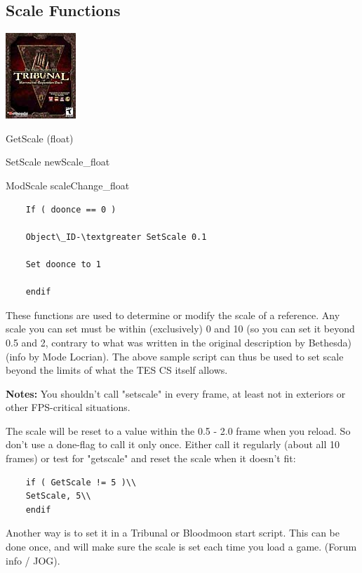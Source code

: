 \hypertarget{scale-functions}{%
\subsection{\texorpdfstring{\hfill\break
Scale Functions}{ Scale Functions}}\label{scale-functions}}

\includegraphics{media/image6.png}

	GetScale (float)
	
	SetScale newScale\_float
	
	ModScale scaleChange\_float

\begin{lstlisting}	
	If ( doonce == 0 )
	
	Object\_ID-\textgreater SetScale 0.1
	
	Set doonce to 1
	
	endif
\end{lstlisting}

These functions are used to determine or modify the scale of a
reference. Any scale you can set must be within (exclusively) 0 and 10
(so you can set it beyond 0.5 and 2, contrary to what was written in the
original description by Bethesda) (info by Mode Locrian). The above
sample script can thus be used to set scale beyond the limits of what
the TES CS itself allows.

\textbf{Notes:} You shouldn't call "setscale" in every frame, at least
not in exteriors or other FPS-critical situations.

The scale will be reset to a value within the 0.5 - 2.0 frame when you
reload. So don't use a done-flag to call it only once. Either call it
regularly (about all 10 frames) or test for "getscale" and reset the
scale when it doesn't fit:

\begin{lstlisting}
	if ( GetScale != 5 )\\
	SetScale, 5\\
	endif
\end{lstlisting}

Another way is to set it in a Tribunal or Bloodmoon start script. This
can be done once, and will make sure the scale is set each time you load
a game. (Forum info / JOG).

